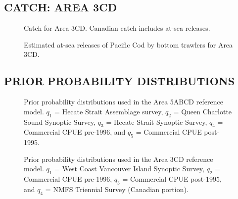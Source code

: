 \documentclass[11pt]{book}
\begin{document}
\hypertarget{catch-area-3cd}{%
\subsection{CATCH: AREA 3CD}\label{catch-area-3cd}}
\begin{figure}[htb]

{\centering {} 

}

\caption{Catch for Area 3CD. Canadian catch includes at-sea releases.}\label{fig:fig-catch-3cd}
\end{figure}
\begin{figure}[htb]

{\centering {} 

}

\caption{Estimated at-sea releases of Pacific Cod by bottom trawlers for Area 3CD.}\label{fig:fig-discards-3cd}
\end{figure}
\clearpage

\hypertarget{prior-probability-distributions}{%
\subsection{PRIOR PROBABILITY DISTRIBUTIONS}\label{prior-probability-distributions}}
\begin{figure}[htb]

{\centering {} 

}

\caption{Prior probability distributions used in the Area 5ABCD reference model. $q_1$ = Hecate Strait Assemblage survey, $q_2$ = Queen Charlotte Sound Synoptic Survey, $q_3$ = Hecate Strait Synoptic Survey, $q_4$ = Commercial CPUE pre-1996, and $q_5$ = Commercial CPUE post-1995.}\label{fig:fig-base-mcmc-priors-5abcd}
\end{figure}
\begin{figure}[htb]

{\centering {} 

}

\caption{Prior probability distributions used in the Area 3CD reference model. $q_1$ = West Coast Vancouver Island Synoptic Survey, $q_2$ = Commercial CPUE pre-1996, $q_3$ = Commercial CPUE post-1995, and $q_4$ = NMFS Triennial Survey (Canadian portion).}\label{fig:fig-base-mcmc-priors-3cd}
\end{figure}
\clearpage
\end{document}
